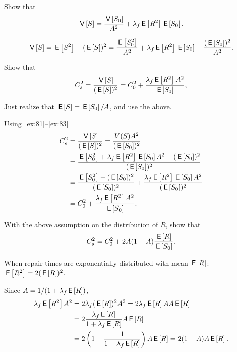 \begin{extra}
Show that 
 \begin{equation*}
 \V{S} = \frac{\V{S_0}}{A^2} + \lambda_f \E{R^2} \E{S_0}.
 \end{equation*}
\begin{solution} 
 \begin{equation*}
 \V{S} = \E{S^2} - (\E S)^2 = 
\frac{\E{S_0^2}}{A^2} + \lambda_f \E{R^2} \E{S_0} -\frac{(\E{S_0})^2}{A^2}.
 \end{equation*}
\end{solution}
\end{extra}

\begin{exercise}
Show that
 \begin{equation*}
 C_s^2 = \frac{\V{S}}{(\E S)^2} = C_0^2 + \frac{\lambda_f \E{R^2} A^2}{\E{S_0}},
 \end{equation*}
\begin{hint} Just realize that $\E{S} = \E{S_0}/A$, and use the above.
\end{hint}
\begin{solution} Using~\cref{ex:81}--\cref{ex:83}
 \begin{align*}
C_s^2 &= \frac{\V{S}}{(\E S)^2} =\frac{V(S) A^2}{(\E{S_0})^2} \\
&=\frac{\E{S_0^2} + \lambda_f \E{R^2} \E{S_0}A^2 -(\E{S_0})^2}{(\E{S_0})^2} \\
&=\frac{\E{S_0^2} -(\E{S_0})^2}{(\E{S_0})^2} + \frac{\lambda_f \E{R^2} \E{S_0}A^2}{(\E{S_0})^2} \\
&=C_0^2 + \frac{\lambda_f \E{R^2}A^2}{\E{S_0}}.
 \end{align*}
\end{solution}
\end{exercise}


\begin{exercise}
With the above assumption on the distribution of $R$, show that
 \begin{equation*}
 C_s^2 = C_0^2 + 2 A(1-A) \frac{\E{R}}{\E{S_0}}.
 \end{equation*}

\begin{solution} 
When repair times are exponentially distributed with mean $\E{R}$: $\E{R^2}=2(\E R)^2$. 

Since $A=1/(1+\lambda_f \E R)$, 
 \begin{equation*}
 \begin{split}
 \lambda_f \E{R^2} A^2 
&= 2\lambda_f (\E R)^2 A^2 = 2 \lambda_f \E R A A \E R \\
&= 2 \frac{\lambda_f \E R }{1+\lambda_f \E R} A \E R \\
&= 2 \left(1-\frac{1}{1+\lambda_f \E R}\right) A \E R = 2(1-A)A \E R.
 \end{split}
 \end{equation*}
\end{solution}
\end{exercise}



